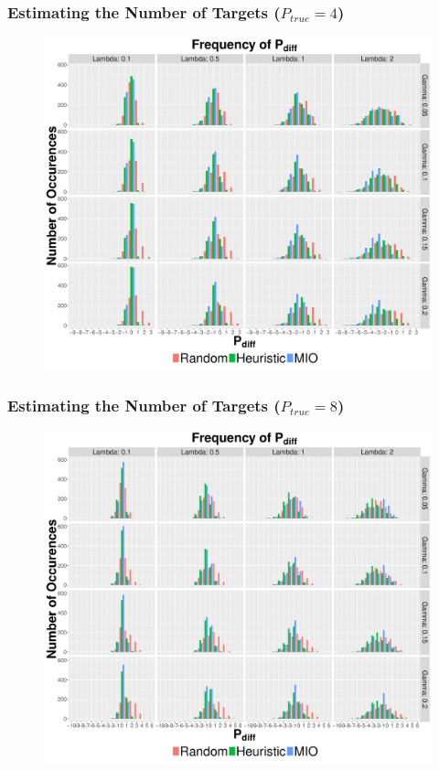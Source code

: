 \documentclass{beamer}
\begin{document}
\begin{frame}
\frametitle{Estimating the Number of Targets ($P_{true}=4$)} 
\begin{figure}[ht]
  \centering
  \includegraphics[width=.7\columnwidth]{../Figures/4_8_Histogram}
\end{figure}
\end{frame}

\begin{frame}
\frametitle{Estimating the Number of Targets ($P_{true}=8$)} 
\begin{figure}[ht]
  \centering
  \includegraphics[width=.7\columnwidth]{../Figures/8_8_Histogram}
\end{figure}
\end{frame}
\end{document}
